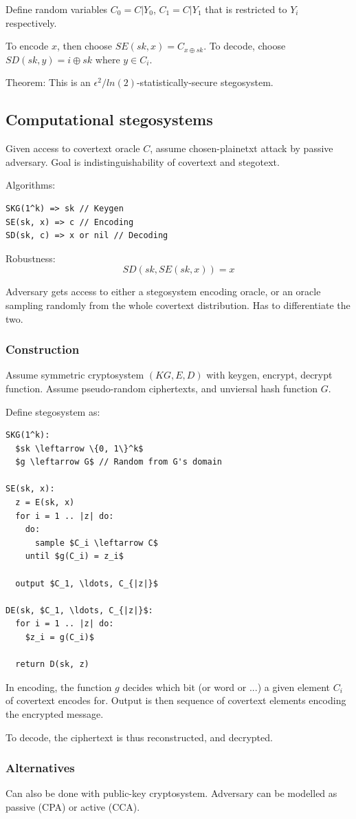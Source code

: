 \documentclass[a4paper]{scrreprt}
\begin{document}
Define random variables $C_0 = C | Y_0$, $C_1 = C | Y_1$ that is restricted to
$Y_i$ respectively.

To encode $x$, then choose $SE(sk, x) = C_{x \oplus sk}$. To decode, choose
$SD(sk, y) = i \oplus sk$ where $y \in C_i$.

Theorem: This is an $\epsilon^2 / ln(2)$-statistically-secure stegosystem.

\subsection{Computational stegosystems}

Given access to covertext oracle $C$, assume chosen-plainetxt attack by passive
adversary. Goal is indistinguishability of covertext and stegotext.

Algorithms:
\begin{lstlisting}
SKG(1^k) => sk // Keygen
SE(sk, x) => c // Encoding
SD(sk, c) => x or nil // Decoding
\end{lstlisting}

Robustness:
\[
		SD(sk, SE(sk, x)) = x
\]

Adversary gets access to either a stegosystem encoding oracle, or an oracle
sampling randomly from the whole covertext distribution. Has to differentiate
the two.

\subsubsection{Construction}

Assume symmetric cryptosystem $(KG, E, D)$ with keygen, encrypt, decrypt
function. Assume pseudo-random ciphertexts, and unviersal hash function $G$.

Define stegosystem as:
\begin{lstlisting}[mathescape]
SKG(1^k):
  $sk \leftarrow \{0, 1\}^k$
  $g \leftarrow G$ // Random from G's domain

SE(sk, x):
  z = E(sk, x)
  for i = 1 .. |z| do:
    do:
      sample $C_i \leftarrow C$
    until $g(C_i) = z_i$
  
  output $C_1, \ldots, C_{|z|}$

DE(sk, $C_1, \ldots, C_{|z|}$:
  for i = 1 .. |z| do:
    $z_i = g(C_i)$

  return D(sk, z)
\end{lstlisting}

In encoding, the function $g$ decides which bit (or word or ...) a given
element $C_i$ of covertext encodes for. Output is then sequence of covertext
elements encoding the encrypted message.

To decode, the ciphertext is thus reconstructed, and decrypted.

\subsubsection{Alternatives}

Can also be done with public-key cryptosystem. Adversary can be modelled as
passive (CPA) or active (CCA).

\printbibliography
\end{document}
